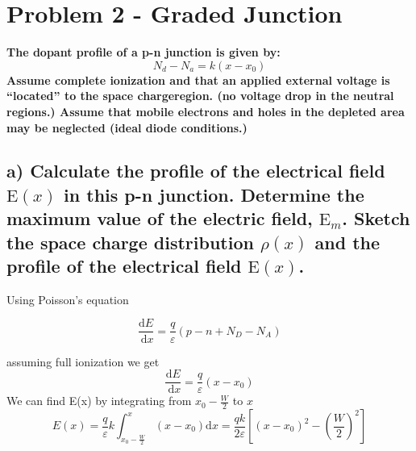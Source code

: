 \section{Problem 2 - Graded Junction}
\textbf{The dopant profile of a p-n junction is given by:$$
N_d-N_a=k\left(x-x_0\right)$$ Assume complete ionization and that an applied external voltage is “located” to the space chargeregion. (no voltage drop in the neutral regions.) Assume that mobile electrons and holes in the depleted area may be neglected (ideal diode conditions.)}

\subsection*{a) Calculate the profile of the electrical field $\mathrm{E}(x)$ in this p-n junction. Determine the maximum value of the electric field, $\mathrm{E}_m$. Sketch the space charge distribution $\rho(x)$ and the profile of the electrical field $\mathrm{E}(x)$.}
Using Poisson's equation

$$
\frac{\mathrm{d} E}{\mathrm{~d} x}=\frac{q}{\varepsilon}\left(p-n+N_D-N_A\right)
$$

assuming full ionization we get
$$
\frac{\mathrm{d} E}{\mathrm{~d} x}=\frac{q}{\varepsilon}\left(x-x_0\right)
$$
We can find E(x) by integrating from $x_0 - \frac{W}{2}$ to $x$
$$
E(x)=\frac{q}{\varepsilon} k \int_{x_0-\frac{W}{2}}^x\left(x-x_0\right) \mathrm{d} x=\frac{q k}{2 \varepsilon}\left[\left(x-x_0\right)^2-\left(\frac{W}{2}\right)^2\right]
$$



